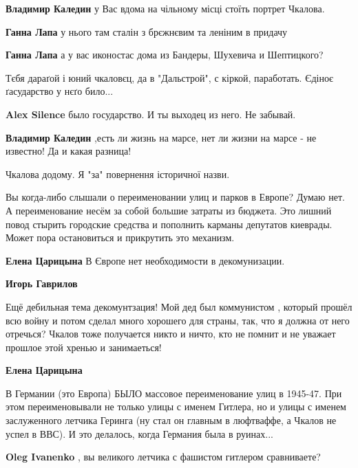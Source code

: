 \begin{itemize}
\begin{itemize} %
\textbf{Владимир Каледин} у Вас вдома на чільному місці стоїть портрет Чкалова.

\textbf{Ганна Лапа} у нього там сталін з брєжнєвим та леніним в придачу

\textbf{Ганна Лапа} а у вас иконостас дома из Бандеры, Шухевича и Шептицкого?

Тєбя дараґой і юний чкаловєц, да в "Дальстрой", с кіркой, паработать. Єдіноє ґасударство у нєґо било...

\textbf{Alex Silence} было государство. И ты выходец из него. Не забывай.

\textbf{Владимир Каледин} ,есть ли жизнь на марсе, нет ли жизни на марсе - не известно!
Да и какая разница!
\end{itemize} %

Чкалова додому. Я "за" повернення історичної назви.


Вы когда-либо слышали о переименовании улиц и парков в Европе? Думаю нет. А
переименование несём за собой большие затраты из бюджета. Это лишний повод
стырить городские средства и пополнить карманы депутатов киеврады. Может пора
остановиться и прикрутить это механизм.

\begin{itemize} %
\textbf{Елена Царицына} В Європе нет необходимости в декомунизации.

\textbf{Игорь Гаврилов} 

Ещё дебильная тема декомунтзация! Мой дед был коммунистом , который прошёл всю
войну и потом сделал много хорошего для страны, так, что я должна от него
отречься? Чкалов тоже получается никто и ничто, кто не помнит и не уважает
прошлое этой хренью и занимаеться!

\textbf{Елена Царицына} 

В Германии (это Европа) БЫЛО массовое переименование улиц в 1945-47. При этом
переименовывали не только улицы с именем Гитлера, но и улицы с именем
заслуженного летчика Геринга (ну стал он главным в люфтваффе, а Чкалов не успел
в ВВС). И это делалось, когда Германия была в руинах...

\textbf{Oleg Ivanenko} , вы великого летчика с фашистом гитлером сравниваете?


\end{itemize}
\end{itemize}
